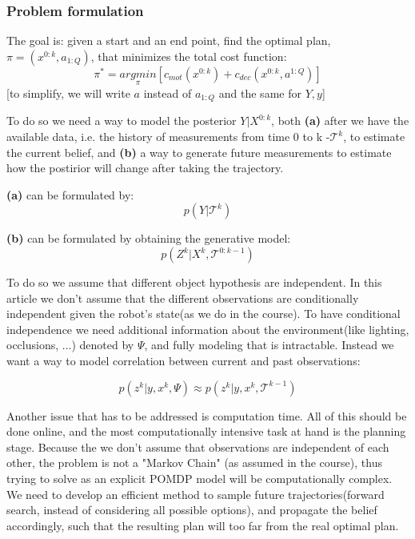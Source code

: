 \documentclass{article}
\begin{document}
	\subsubsection{Problem formulation}
	The goal is:
	given a start and an end point,
	find the optimal plan, $\pi=(x^{0:k},a_{1:Q})$, that minimizes the total cost function:
	\begin{equation}
	\pi^* = \underset{\pi}{argmin}[c_{mot}(x^{0:k}) + c_{dec}(x^{0:k},a^{1:Q})]
	\end{equation}
	[to simplify, we will write $a$ instead of $a_{1:Q}$ and the same for $Y,y$]
	
	To do so we need a way to model the posterior $Y|X^{0:k}$, both \textbf{(a)} after we have the available data, i.e. the history of measurements from time 0 to k -$\mathcal{T}^k$, to estimate the current belief,
	and \textbf{(b)} a way to generate future measurements to estimate how the postirior will change after taking the trajectory.
	
	\textbf{(a)} can be formulated by:
	\begin{equation}
	p(Y|\mathcal{T}^k)
	\end{equation}
	
	\textbf{(b)} can be formulated by obtaining the generative model:
	\begin{equation}
	p(Z^k|X^k,\mathcal{T}^{0:k-1})
	\end{equation}
	
	To do so we assume that different object hypothesis are independent. In this article we don't assume that the different observations are conditionally independent given the robot's state(as we do in the course). To have conditional independence we need additional information about the environment(like lighting, occlusions, ...) denoted by $\Psi$, and fully modeling that is intractable. Instead we want a way to model correlation between current and past observations:
	
	\begin{equation}
	p(z^k|y,x^k,\Psi) \approx p(z^k|y,x^k,\mathcal{T}^{k-1})
	\end{equation}
	
	Another issue that has to be addressed is computation time. All of this should be done online, and the most computationally intensive task at hand is the planning stage. Because the we don't assume that observations are independent of each other, the problem is not a "Markov Chain" (as assumed in the course), thus trying to solve as an explicit POMDP model will be computationally complex. We need to develop an efficient method to sample future trajectories(forward search, instead of considering all possible options), and propagate the belief accordingly, such that the resulting plan will too far from the real optimal plan.
	
\end{document}

